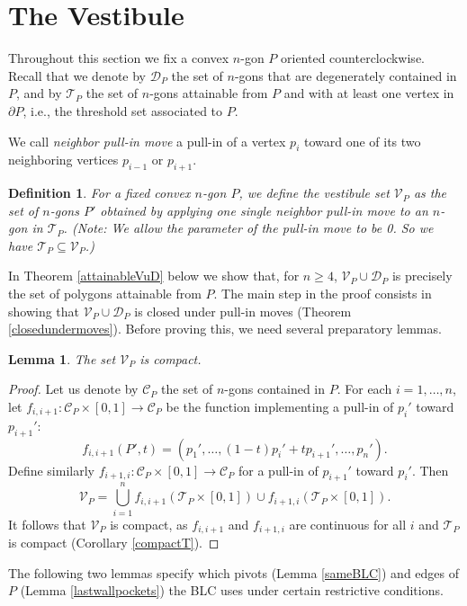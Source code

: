 \documentclass[11pt]{amsart}
\newtheorem{lemma}[theorem]{Lemma}
\newtheorem{definition}[theorem]{Definition}
\theoremstyle{remark}
\numberwithin{equation}{section}
\newcommand{\C}{\mathcal{C}}
\newcommand{\D}{\mathcal{D}}
\newcommand{\TT}{\mathcal{T}}
\newcommand{\V}{\mathcal{V}}
\renewcommand{\geq}{\geqslant}
\begin{document}
\section{The Vestibule}
Throughout this section we fix a convex $n$-gon $P$ oriented counterclockwise.  Recall that we denote by $\D_P$ the set of $n$-gons that are degenerately contained in $P$, and by $\TT_P$ the set of  $n$-gons attainable from $P$ and with at least one vertex in $\partial P$, i.e., the threshold set associated to $P$. 



We call \emph{neighbor pull-in move} a pull-in  of a vertex $p_i$ toward one of its two neighboring vertices  $p_{i-1}$ or $p_{i+1}$.


\begin{definition}
For a fixed convex $n$-gon $P$,  we define the vestibule set $\V_P$ as the set of $n$-gons $P'$ obtained 
by applying one single neighbor pull-in move to an $n$-gon in $\TT_P$. (\emph{Note}: 
We allow the parameter of the pull-in move to be 0. So we have $\TT_P\subseteq \V_P$.) 
\end{definition}
 

In Theorem \ref{attainableVuD} below we show that, for $n\geq 4$, $\V_P\cup \D_P$ is precisely the set of polygons attainable from $P$.
The main step in the proof consists in showing that $\V_P\cup\D_P$ is closed under pull-in moves (Theorem \ref{closedundermoves}). 
Before proving this, we need several preparatory  lemmas.



\begin{lemma}\label{compactV}
The set $\V_P$ is compact. 
\end{lemma}
\begin{proof}
Let us denote by $\C_P$ the set of $n$-gons contained in $P$.
For each $i=1,\ldots,n$, let $f_{i,i+1}\colon \C_P\times [0,1]\to \C_P$ be the function implementing a pull-in of $p_i'$ toward $p_{i+1}'$:
\[
f_{i,i+1}(P',t)=(p_1',\ldots, (1-t)p_i'+tp_{i+1}',\ldots,p_n').
\]
Define similarly $f_{i+1,i}\colon \C_{P}\times [0,1]\to \C_P$ for a pull-in of $p_{i+1}'$ toward $p_i'$. Then 
\[
\V_P=\bigcup_{i=1}^n f_{i,i+1}(\TT_P \times [0,1])\cup f_{i+1,i}(\TT_P \times [0,1]). 
\] 
It follows that $\V_P$ is compact, as $f_{i,i+1}$ and $f_{i+1,i}$ are continuous for all $i$ and $\TT_P$ is compact (Corollary \ref{compactT}).
\end{proof}




The following two lemmas specify which pivots (Lemma \ref{sameBLC}) and edges of $P$ (Lemma \ref{lastwallpockets}) the BLC uses under certain restrictive conditions. 
\end{document}
